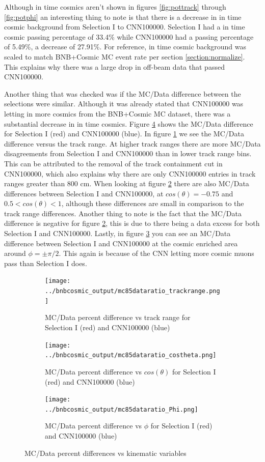 Although in time cosmics aren't shown in figures \ref{fig:pottrack} through \ref{fig:potphi} an interesting thing to note is that there is a decrease in in time cosmic background from Selection I to CNN100000. Selection I had a in time cosmic passing percentage of 33.4\% while CNN100000 had a passing percentage of 5.49\%, a decrease of 27.91\%. For reference, in time cosmic background was scaled to match BNB+Cosmic MC event rate per section \ref{section:normalize}. This explains why there was a large drop in off-beam data that passed CNN100000. 


Another thing that was checked was if the MC/Data difference between the selections were similar. Although it was already stated that CNN100000 was letting in more cosmics from the BNB+Cosmic MC dataset, there was a substantial decrease in in time cosmics. Figure \ref{fig:diff} shows the MC/Data difference for Selection I (red) and CNN100000 (blue). In figure \ref{fig:difftrack} we see the MC/Data difference versus the track range. At higher track ranges there are more MC/Data disagreements from Selection I and CNN100000 than in lower track range bins. This can be attributed to the removal of the track containment cut in CNN100000, which also explains why there are only CNN100000 entries in track ranges greater than 800 cm. When looking at figure \ref{fig:diffcostheta} there are also MC/Data differences between Selection I and CNN100000, at $cos(\theta) = -0.75$ and $ 0.5<cos(\theta)<1$, although these differences are small in comparison to the track range differences. Another thing to note is the fact that the MC/Data difference is negative for figure \ref{fig:diffcostheta}, this is due to there being a data excess for both Selection I and CNN100000. Lastly, in figure \ref{fig:diffphi} you can see an MC/Data difference between Selection I and CNN100000 at the cosmic enriched area around $\phi=\pm\pi/2$. This again is because of the CNN letting more cosmic muons pass than Selection I does. 
\begin{figure}[htp!]
\centering
	\begin{subfigure}[t]{.475\textwidth}
		\texttt{[image: ../bnbcosmic\_output/mc85dataratio\_trackrange.png]}
		\caption{MC/Data percent difference vs track range for Selection I (red) and CNN100000 (blue)} 
		\label{fig:difftrack}
	\end{subfigure}
	\begin{subfigure}[t]{.475\textwidth}
	\centering
		\texttt{[image: ../bnbcosmic\_output/mc85dataratio\_costheta.png]}
		\caption{MC/Data percent difference vs $cos(\theta)$ for Selection I (red) and CNN100000 (blue)} 
		\label{fig:diffcostheta}
	\end{subfigure}
	\begin{subfigure}[t]{.475\textwidth}
	\centering
		\texttt{[image: ../bnbcosmic\_output/mc85dataratio\_Phi.png]}
		\caption{MC/Data percent difference vs $\phi$ for Selection I (red) and CNN100000 (blue)} 
		\label{fig:diffphi}
	\end{subfigure}
\caption{MC/Data percent differences vs kinematic variables}
\label{fig:diff}
\end{figure}
